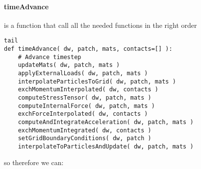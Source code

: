 \documentclass[11pt,fleqn]{book} %
\begin{document}
\paragraph{timeAdvance}
    is a function that call all the needed functions in the right order 
\begin{lstlisting}tail
def timeAdvance( dw, patch, mats, contacts=[] ):
    # Advance timestep
    updateMats( dw, patch, mats )
    applyExternalLoads( dw, patch, mats )
    interpolateParticlesToGrid( dw, patch, mats )
    exchMomentumInterpolated( dw, contacts )
    computeStressTensor( dw, patch, mats )
    computeInternalForce( dw, patch, mats )
    exchForceInterpolated( dw, contacts )    
    computeAndIntegrateAcceleration( dw, patch, mats )
    exchMomentumIntegrated( dw, contacts )
    setGridBoundaryConditions( dw, patch )
    interpolateToParticlesAndUpdate( dw, patch, mats )
\end{lstlisting}
so therefore we can:
\end{document}
